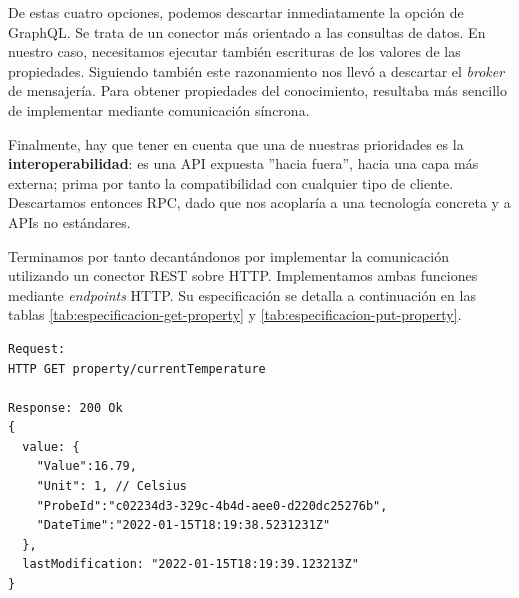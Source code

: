 De estas cuatro opciones, podemos descartar inmediatamente la opción de GraphQL. Se trata de un conector más orientado a las consultas de datos. En nuestro caso, necesitamos ejecutar también escrituras de los valores de las propiedades. Siguiendo también este razonamiento nos llevó a descartar el \emph{broker} de mensajería. Para obtener propiedades del conocimiento, resultaba más sencillo de implementar mediante comunicación síncrona.

Finalmente, hay que tener en cuenta que una de nuestras prioridades es la \textbf{interoperabilidad}: es una API expuesta ''hacia fuera'', hacia una capa más externa; prima por tanto la compatibilidad con cualquier tipo de cliente. Descartamos entonces RPC, dado que nos acoplaría a una tecnología concreta y a APIs no estándares.

Terminamos por tanto decantándonos por implementar la comunicación utilizando un conector REST sobre HTTP. Implementamos ambas funciones mediante \emph{endpoints} HTTP. Su especificación se detalla a continuación en las tablas \ref{tab:especificacion-get-property} y \ref{tab:especificacion-put-property}.

\newsavebox\getpropertyrequestbox
\begin{lrbox}{\getpropertyrequestbox}
  \begin{minipage}[t]{1in}
    \begin{verbatim}
Request:
HTTP GET property/currentTemperature

Response: 200 Ok
{
  value: {
    "Value":16.79,
    "Unit": 1, // Celsius
    "ProbeId":"c02234d3-329c-4b4d-aee0-d220dc25276b",
    "DateTime":"2022-01-15T18:19:38.5231231Z"
  },
  lastModification: "2022-01-15T18:19:39.123213Z"
}
    \end{verbatim}
  \end{minipage}
\end{lrbox}

